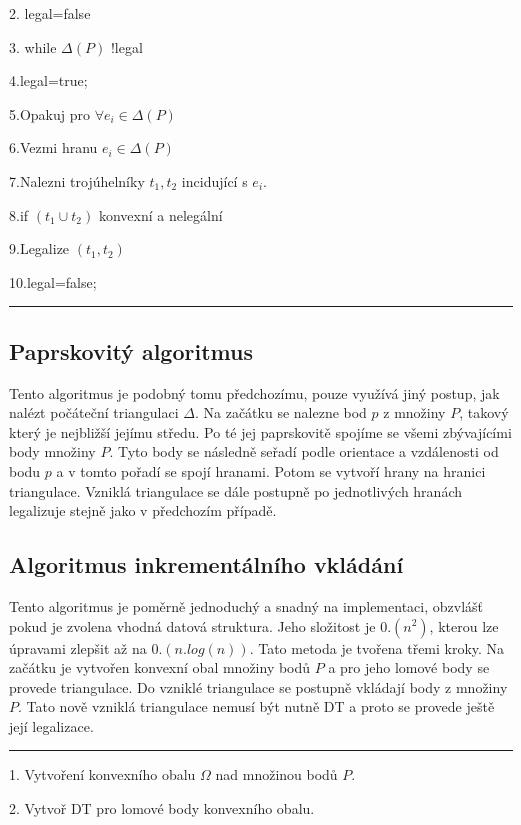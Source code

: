 \documentclass[12pt,a4paper]{article}
\begin{document}
2. legal=false

3. while $\Delta(P)$ !legal

4.\indent legal=true;

5.\indent Opakuj pro $\forall e_i \in \Delta(P)$

6.\indent \indent Vezmi hranu $e_i \in \Delta(P)$

7.\indent \indent Nalezni trojúhelníky $t_1,t_2$ incidující s $e_i$.

8.\indent \indent if $(t_1 \cup t_2)$ konvexní a nelegální

9.\indent \indent \indent  Legalize $(t_1,t_2)$

10.\indent \indent \indent legal=false;
\newline
\hrule


\subsection{Paprskovitý algoritmus}

Tento algoritmus je podobný tomu předchozímu, pouze využívá jiný postup, jak nalézt počáteční triangulaci $\Delta$. Na začátku se nalezne bod $p$ z množiny $P$, takový který je nejbližší jejímu středu. Po té jej paprskovitě spojíme se všemi zbývajícími body množiny $P$. Tyto body se následně seřadí podle orientace a vzdálenosti od bodu $p$ a v tomto pořadí se spojí hranami. Potom se vytvoří hrany na hranici triangulace. Vzniklá triangulace se dále postupně po jednotlivých hranách legalizuje stejně jako v předchozím případě.


\subsection{Algoritmus inkrementálního vkládání}

Tento algoritmus je poměrně jednoduchý a snadný na implementaci, obzvlášť pokud je zvolena vhodná datová struktura. Jeho složitost je $0.(n^2)$, kterou lze úpravami zlepšit až na $0.(n.log(n))$. Tato metoda je tvořena třemi kroky. Na začátku je vytvořen konvexní obal množiny bodů $P$ a pro jeho lomové body se provede triangulace. Do vzniklé triangulace se postupně vkládají body z množiny $P$. Tato nově vzniklá triangulace nemusí být nutně DT a proto se provede ještě její legalizace.

\bigskip
\hrule
1.  Vytvoření konvexního obalu $\Omega$ nad množinou bodů $P$.

2.  Vytvoř DT pro lomové body konvexního obalu.
\end{document}
